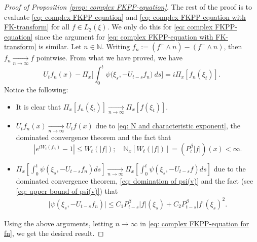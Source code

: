 \documentclass[12pt]{amsart}
\theoremstyle{plain}
\theoremstyle{definition}
\numberwithin{equation}{section}
\begin{document}
\begin{proof}[Proof of Proposition \ref{prop: complex FKPP-equation}]
    The rest of the proof is to evaluate \eqref{eq: complex FKPP-equation} and \eqref{eq: complex FKPP-equation with FK-transform} for all $f\in L_2(\xi)$. We only do this for \eqref{eq: complex FKPP-equation} since the argument for \eqref{eq: complex FKPP-equation with FK-transform} is similar.
    Let $n \in \mathbb N$.
    Writing $f_n := (f^+ \wedge n) - (f^- \wedge n)$, then $f_n \xrightarrow[n\to \infty]{} f$ pointwise.
    From what we have proved, we have
\begin{equation}
\label{eq: complex FKPP-equation for fn}
    U_tf_n(x) - \Pi_{x} \Big[\int_0^t \psi\big(\xi_s, - U_{t-s}f_n\big) ~ds\Big]
    = i \Pi_{x} [f_n(\xi_t)].
\end{equation}
    Notice the following:
\begin{itemize}
\item
    It is clear that $\Pi_{x}[f_n(\xi_t)] \xrightarrow[n\to \infty]{} \Pi_{x}[f(\xi_t)]$.
\item
     $U_tf_n(x) \xrightarrow[n\to \infty]{} U_tf(x)$ due to \eqref{eq: N and characteristic exponent}, the dominated convergence theorem and the fact that
\[
    |e^{i W_t(f_n)} - 1| \leq W_t(|f|);
    \quad \mathbb N_x[W_t(|f|)] = (P_t^\beta |f|)(x) < \infty.
\]
\item
     $\Pi_{x} [\int_0^t \psi(\xi_s,- U_{t-s}f_n)ds] \xrightarrow[n\to \infty]{} \Pi_{x} [\int_0^t \psi(\xi_s,- U_{t-s}f)ds]$ due to the dominated convergence theorem, \eqref{eq: domination of psi(v)} and the fact (see \eqref{eq: upper bound of psi(v)}) that
\begin{align}
    \big|\psi(\xi_s,- U_{t-s}f_n)\big|
    \leq C_1 P_{t-s}^\beta|f|(\xi_s)+C_2 P_{t-s}^\beta|f|(\xi_s)^2.
\end{align}
\end{itemize}
    Using the above arguments, letting $n \to \infty$ in \eqref{eq: complex FKPP-equation for fn}, we get the desired result.
\end{proof}
\end{document}
